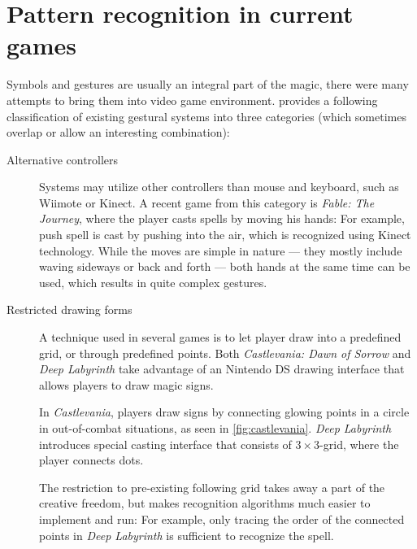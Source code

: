\section{Pattern recognition in current games}

Symbols and gestures are usually an integral part of the magic, there were many attempts to bring them into video game environment. \citet{gameMagic} provides a following classification of existing gestural systems into three categories (which sometimes overlap or allow an interesting combination):


\begin{description}
\item[Alternative controllers]
Systems may utilize other controllers than mouse and keyboard, such as Wiimote or Kinect. A recent game from this category is \emph{Fable: The Journey}, where the player casts spells by moving his hands: For example, push spell is cast by pushing into the air, which is recognized using Kinect technology. While the moves are simple in nature --- they mostly include waving sideways or back and forth --- both hands at the same time can be used, which results in quite complex gestures.

\item[Restricted drawing forms]
A technique used in several games is to let player draw into a predefined grid, or through predefined points. Both \emph{Castlevania: Dawn of Sorrow} and \emph{Deep Labyrinth} take advantage of an Nintendo DS drawing interface that allows players to draw magic signs.

In \emph{Castlevania}, players draw signs by connecting glowing points in a circle in out-of-combat situations, as seen in \cref{fig:castlevania}. \emph{Deep Labyrinth} introduces special casting interface that consists of $3\times 3$-grid, where the player connects dots.

The restriction to pre-existing following grid takes away a part of the creative freedom, but makes recognition algorithms much easier to implement and run: For example, only tracing the order of the connected points in \emph{Deep Labyrinth} is sufficient to recognize the spell.


\end{description}
